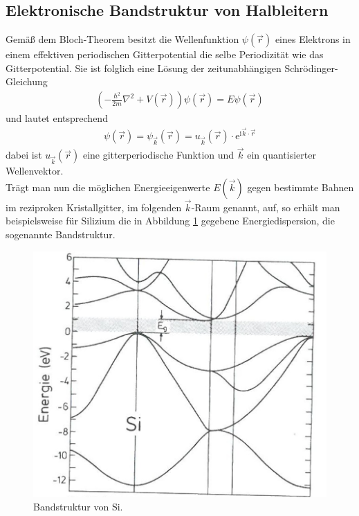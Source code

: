 \documentclass[a4paper,12pt]{article}
\begin{document}
\subsection{Elektronische Bandstruktur von Halbleitern}
Gemäß dem Bloch-Theorem besitzt die Wellenfunktion $\psi(\vec{r})$ eines Elektrons in einem effektiven periodischen Gitterpotential die selbe Periodizität wie das Gitterpotential. Sie ist folglich eine Lösung der zeitunabhängigen Schrödinger-Gleichung
\begin{align}
\left(-\frac{\hbar^2}{2m}\nabla^2+V(\vec{r})\right)\psi(\vec{r})=E\psi(\vec{r})
\end{align}
und lautet entsprechend
\begin{align}
\psi(\vec{r})=\psi_{\vec{k}}(\vec{r})=u_{\vec{k}}(\vec{r})\cdot \mathrm{e}^{\mathrm{i}\vec{k}\cdot \vec{r}}
\end{align}
dabei ist $u_{\vec{k}}(\vec{r})$ eine gitterperiodische Funktion und $\vec{k}$ ein quantisierter Wellenvektor.\\
Trägt man nun die möglichen Energieeigenwerte $E(\vec{k})$ gegen bestimmte Bahnen im reziproken Kristallgitter, im folgenden $\vec{k}$-Raum genannt, auf, so erhält man beispielsweise für Silizium die in Abbildung \ref{fig:Si_bandstructure} gegebene Energiedispersion, die sogenannte Bandstruktur.
\begin{figure}[h]
\begin{center}
\includegraphics[angle=1.4,scale=0.5]{Si_Bandstruktur.jpeg}
\caption{Bandstruktur von Si. \cite{lit:Iba09}}
\label{fig:Si_bandstructure}
\end{center}
\end{figure}
\end{document}
